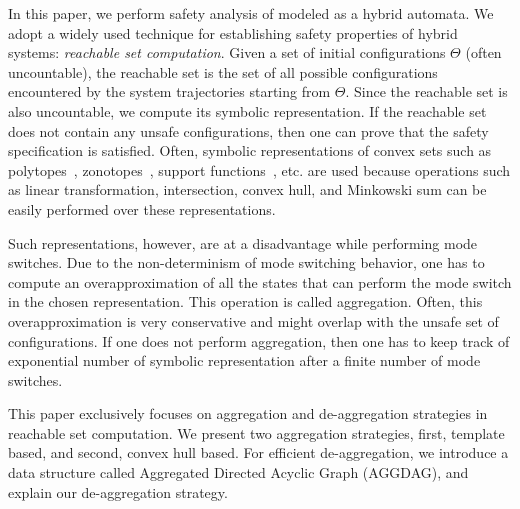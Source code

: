 In this paper, we perform safety analysis of  modeled as a hybrid automata.
%
We adopt a widely used technique for establishing safety properties of hybrid systems: {\em reachable set computation}.
%
%
Given a set of initial configurations $\Theta$ (often uncountable), the reachable set is the set of all possible configurations encountered by the system trajectories starting from $\Theta$. 
%
Since the reachable set is also uncountable, we compute its symbolic representation.
%
If the reachable set does not contain any unsafe configurations, then one can prove that the safety specification is satisfied.
%
Often, symbolic representations of convex sets such as polytopes~\cite{Frehse05_phaver}, zonotopes~\cite{girard2006efficient}, support functions~\cite{spaceex}, etc. are used because operations such as linear transformation, intersection, convex hull, and Minkowski sum can be easily performed over these representations.
%

Such representations, however, are at a disadvantage while performing mode switches.
%
Due to the non-determinism of mode switching behavior, one has to compute an overapproximation of all the states that can perform the mode switch in the chosen representation.
%
This operation is called aggregation.
%
Often, this overapproximation is very conservative and might overlap with the unsafe set of configurations.
%
If one does not perform aggregation, then one has to keep track of exponential number of symbolic representation after a finite number of mode switches.

This paper exclusively focuses on aggregation and de-aggregation strategies in reachable set computation. 
%
We present two aggregation strategies, first, template based, and second, convex hull based. 
%
For efficient de-aggregation, we introduce a data structure called Aggregated Directed Acyclic Graph (AGGDAG), and explain our de-aggregation strategy.
%

